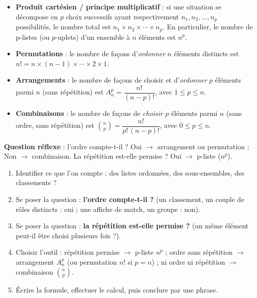 \documentclass[11pt]{article}
\newcommand{\cle}[1]{{\popxbold\color{popdark}#1}}
\begin{document}
\begin{aretenir}
\begin{itemize}
\item \textbf{Produit cartésien / principe multiplicatif} : si une situation se décompose en $p$ choix successifs ayant respectivement $n_1, n_2, \ldots, n_p$ possibilités, le nombre total est $n_1 \times n_2 \times \cdots \times n_p$. En particulier, le nombre de \cle{p-listes} (ou $p$-uplets) d'un ensemble à $n$ éléments est $n^p$.
\item \textbf{Permutations} : le nombre de façons d'\emph{ordonner} $n$ éléments distincts est $n! = n \times (n-1) \times \cdots \times 2 \times 1$.
\item \textbf{Arrangements} : le nombre de façons de choisir et d'\emph{ordonner} $p$ éléments parmi $n$ (sans répétition) est $A_n^p = \dfrac{n!}{(n-p)!}$, avec $1 \le p \le n$.
\item \textbf{Combinaisons} : le nombre de façons de \emph{choisir} $p$ éléments parmi $n$ (sans ordre, sans répétition) est $\binom{n}{p} = \dfrac{n!}{p!\,(n-p)!}$, avec $0 \le p \le n$.
\end{itemize}
\textbf{Question réflexe} : l'ordre compte-t-il ? Oui $\rightarrow$ arrangement ou permutation ; Non $\rightarrow$ combinaison. La répétition est-elle permise ? Oui $\rightarrow$ p-liste ($n^p$).
\end{aretenir}

\begin{methode}
\begin{enumerate}
\item Identifier ce que l'on compte : des listes ordonnées, des sous-ensembles, des classements ?
\item Se poser la question : \textbf{l'ordre compte-t-il ?} (un classement, un couple de rôles distincts : oui ; une affiche de match, un groupe : non).
\item Se poser la question : \textbf{la répétition est-elle permise ?} (un même élément peut-il être choisi plusieurs fois ?).
\item Choisir l'outil : répétition permise $\rightarrow$ p-liste $n^p$ ; ordre sans répétition $\rightarrow$ arrangement $A_n^p$ (ou permutation $n!$ si $p=n$) ; ni ordre ni répétition $\rightarrow$ combinaison $\binom{n}{p}$.
\item Écrire la formule, effectuer le calcul, puis conclure par une phrase.
\end{enumerate}
\end{methode}
\end{document}
